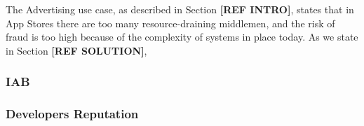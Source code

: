 The Advertising use case, as described in Section \textbf{[REF INTRO]}, states that in App Stores there are too many resource-draining middlemen, and the risk of fraud is too high because of the complexity of systems in place today. As we state in Section \textbf{[REF SOLUTION]}, 

\subsubsection{IAB}

\subsubsection{Developers Reputation}






